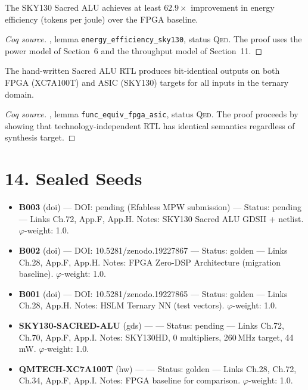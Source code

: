 \begin{theorem}
\label{thm:72-energy}
The SKY130 Sacred ALU achieves at least \(62.9\times\) improvement in
energy efficiency (tokens per joule) over the FPGA baseline.
\end{theorem}
\begin{proof}[Coq source]
, lemma
\texttt{energy\_efficiency\_sky130}, status \textsc{Qed}. The proof
uses the power model of Section~6 and the throughput model of
Section~11.
\end{proof}

\begin{theorem}
\label{thm:72-func-equiv}
The hand-written Sacred ALU RTL produces bit-identical outputs on both
FPGA (XC7A100T) and ASIC (SKY130) targets for all inputs in the
ternary domain.
\end{theorem}
\begin{proof}[Coq source]
, lemma
\texttt{func\_equiv\_fpga\_asic}, status \textsc{Qed}. The proof
proceeds by showing that technology-independent RTL has identical
semantics regardless of synthesis target.
\end{proof}

\section{14. Sealed Seeds}\label{fa_72:sealed-seeds}

\begin{itemize}
\tightlist
\item
  \textbf{B003} (doi) --- DOI: pending (Efabless MPW submission) ---
  Status: pending --- Links Ch.72, App.F, App.H. Notes: SKY130 Sacred
  ALU GDSII + netlist. \(\varphi\)-weight: 1.0.
\item
  \textbf{B002} (doi) --- DOI: 10.5281/zenodo.19227867 --- Status:
  golden --- Links Ch.28, App.F, App.H. Notes: FPGA Zero-DSP
  Architecture (migration baseline). \(\varphi\)-weight: 1.0.
\item
  \textbf{B001} (doi) --- DOI: 10.5281/zenodo.19227865 --- Status:
  golden --- Links Ch.28, App.H. Notes: HSLM Ternary NN (test vectors).
  \(\varphi\)-weight: 1.0.
\item
  \textbf{SKY130-SACRED-ALU} (gds) ---
   --- Status: pending --- Links
  Ch.72, Ch.70, App.F, App.I. Notes: SKY130HD, 0 multipliers,
  260\,MHz target, 44\,mW. \(\varphi\)-weight: 1.0.
\item
  \textbf{QMTECH-XC7A100T} (hw) ---
   --- Status: golden --- Links
  Ch.28, Ch.72, Ch.34, App.F, App.I. Notes: FPGA baseline for
  comparison. \(\varphi\)-weight: 1.0.
\end{itemize}

